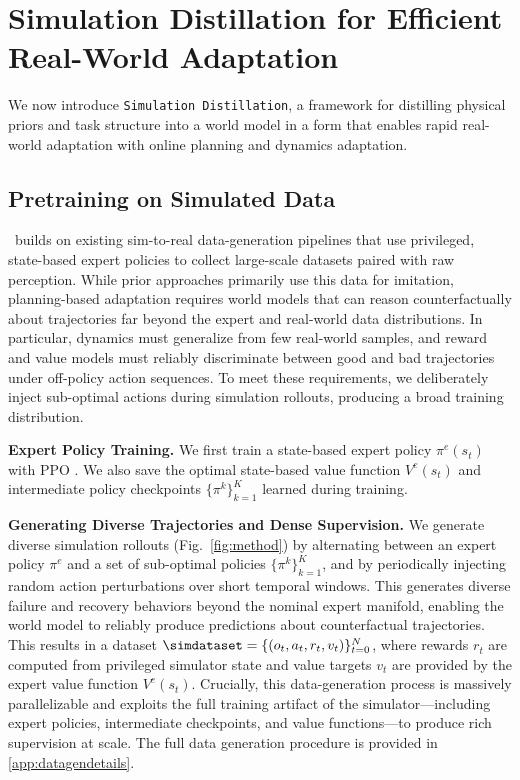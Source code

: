 \section{Simulation Distillation for Efficient Real-World Adaptation}

We now introduce \texttt{Simulation Distillation}, a framework for distilling physical priors and task structure into a world model in a form that enables rapid real-world adaptation with online planning and dynamics adaptation.  


\subsection{Pretraining on Simulated Data} \label{sec:pretrain}
 
\Method\ builds on existing sim-to-real data-generation pipelines that use privileged, state-based expert policies to collect large-scale datasets paired with raw perception. While prior approaches primarily use this data for imitation, planning-based adaptation requires world models that can reason counterfactually about trajectories far beyond the expert and real-world data distributions. In particular, dynamics must generalize from few real-world samples, and reward and value models must reliably discriminate between good and bad trajectories under off-policy action sequences. To meet these requirements, we deliberately inject sub-optimal actions during simulation rollouts, producing a broad training distribution.

\textbf{Expert Policy Training.} We first train a state-based expert policy $\pi^e(s_t)$ with PPO \cite{schulman2017proximal}. We also save the optimal state-based value function $V^e(s_t)$ and intermediate policy checkpoints $\{\pi^k\}_{k=1}^{K}$ learned during training.


\textbf{Generating Diverse Trajectories and Dense Supervision.} We generate diverse simulation rollouts (Fig.~\ref{fig:method}) by alternating between an expert policy $\pi^e$ and a set of sub-optimal policies $\{\pi^k\}_{k=1}^K$, and by periodically injecting random action perturbations over short temporal windows. This generates diverse failure and recovery behaviors beyond the nominal expert manifold, enabling the world model to reliably produce predictions about counterfactual trajectories. This results in a dataset $\simdataset = \{(o_t, a_t, r_t, v_t)\}_{t=0}^N$, where rewards $r_t$ are computed from privileged simulator state and value targets $v_t$ are provided by the expert value function $V^e(s_t)$. Crucially, this data-generation process is massively parallelizable and exploits the full training artifact of the simulator—including expert policies, intermediate checkpoints, and value functions—to produce rich supervision at scale. The full data generation procedure is provided in \cref{app:datagendetails}.



